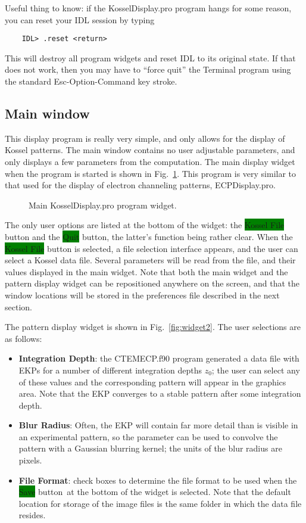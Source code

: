 \documentclass[DIV=calc, paper=letter, fontsize=11pt]{scrartcl}	 %
\newcommand{\button}[1]{\colorbox{green}{\textsf{#1}} button}
\begin{document}
Useful thing to know: if the \textsf{KosselDisplay.pro}  program hangs for some reason, you can reset your IDL session by typing
\begin{verbatim}
	IDL> .reset <return>
\end{verbatim}
This will destroy all program widgets and reset IDL to its original state.  If that does not work, then you may have to ``force quit'' the Terminal program
using the standard Esc-Option-Command key stroke.

\subsection{Main window\label{sec:idlmain}}
This display program is really very simple, and only allows for the display of Kossel patterns.
The main window contains no user adjustable parameters, and only displays a few parameters from the computation.
The main display widget when the program is started is shown in Fig.~\ref{fig:widget1}.  This program is very 
similar to that used for the display of electron channeling patterns, \textsf{ECPDisplay.pro}.

\begin{figure}[h]
\leavevmode\centering
{}
\caption{\label{fig:widget1}Main \textsf{KosselDisplay.pro} program widget.}
\end{figure}

The only user options are listed at the bottom of the widget: the \button{Kossel File} and the \button{Quit}, the latter's function being 
rather clear.  When the \button{Kossel File} is selected, a file selection interface appears, and the user can select a Kossel data file. 
Several parameters will be read from the file, and their values displayed in the main widget.  Note that both the main widget and 
the pattern display widget can be repositioned anywhere on the screen, and that the window locations will be stored in the preferences
file described in the next section.  

The pattern display widget is shown in Fig.~\ref{fig:widget2}.  The user selections are as follows:
\begin{itemize}
	\item \textbf{Integration Depth}: the \textsf{CTEMECP.f90} program generated a data file with EKPs for a number of different
	integration depths $z_0$; the user can select any of these values and the corresponding pattern will appear in the graphics area.
	Note that the EKP converges to a stable pattern after some integration depth.
	\item \textbf{Blur Radius}: Often, the EKP will contain far more detail than is visible in an experimental pattern, so the 
	parameter can be used to convolve the pattern with a Gaussian blurring kernel; the units of the blur radius are pixels.
	\item \textbf{File Format}: check boxes to determine the file format to be used when the \button{Save}\ at the bottom of the widget
	is selected.  Note that the default location for storage of the image files is the same folder in which the data file resides. 
\end{itemize}
\end{document}

